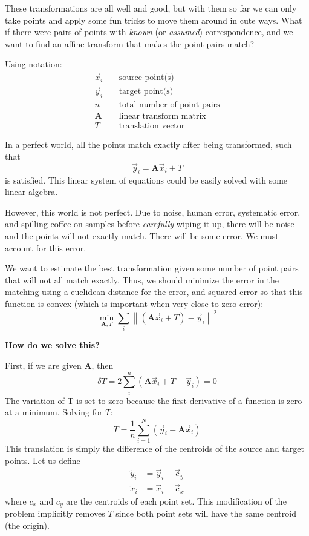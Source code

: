 These transformations are all well and good, but with them so far we can only take points and apply some fun tricks to move them around in cute ways. What if there were \underline{pairs} of points with \emph{known} (or \emph{assumed}) correspondence, and we want to find an affine transform that makes the point pairs \underline{match}?

Using notation:
\begin{align}
\vec{x}_i &\; &\text{source point(s)}\\
\vec{y}_i & &\text{target point(s)}\\
n && \text{total number of point pairs}\\
\mathbf{\mathbf{A}}& & \text{linear transform matrix}\\
T & &\text{translation vector}
\end{align}

In a perfect world, all the points match exactly after being transformed, such that 
\begin{equation}
\vec{y}_i = \mathbf{A} \vec{x}_i +T
\end{equation}
is satisfied. This linear system of equations could be easily solved with some linear algebra.

However, this world is not perfect. Due to noise, human error, systematic error, and spilling coffee on samples before \emph{carefully} wiping it up, there will be noise and the points will not exactly match. There will be some error. We must account for this error.

We want to estimate the best transformation given some number of point pairs that will not all match exactly. Thus, we should minimize the error in the matching using a euclidean distance for the error, and squared error so that this function is convex (which is important when very close to zero error):
\begin{equation}
\underset{\mathbf{A},T}{\min}\sum_i\left\|(\mathbf{A}\vec{x}_i + T) - \vec{y}_i\right\|^2
\end{equation}

\textbf{How do we solve this?}

First, if we are given $\mathbf{A}$, then 
\begin{equation}
\delta T = 2 \sum_i^n \left(\mathbf{A}\vec{x}_i + T-\vec{y}_i\right) = 0
\end{equation}
The variation of T is set to zero because the first derivative of a function is zero at a minimum.
Solving for $T$:
\begin{equation}
T=\frac{1}{n}\sum_{i=1}^N \left(\vec{y}_i-\mathbf{A}\vec{x}_i\right)
\end{equation}
This translation is simply the difference of the centroids of the source and target points. Let us define
\begin{align}
\tilde{y}_i &= \vec{y}_i - \vec{c}_y\\
\tilde{x}_i &= \vec{x}_i - \vec{c}_x
\end{align}
where $c_x$ and $c_y$ are the centroids of each point set. This modification of the problem implicitly removes $T$ since both point sets will have the same centroid (the origin).

